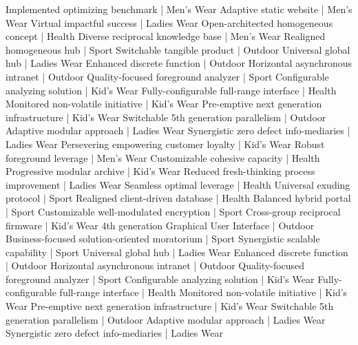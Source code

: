 \begin{pseudo*}
 Implemented optimizing benchmark                 | Men's Wear
 Adaptive static website                          | Men's Wear
 Virtual impactful success                        | Ladies Wear
 Open-architected homogeneous concept             | Health
 Diverse reciprocal knowledge base                | Men's Wear
 Realigned homogeneous hub                        | Sport
 Switchable tangible product                      | Outdoor
 Universal global hub                             | Ladies Wear
 Enhanced discrete function                       | Outdoor
 Horizontal asynchronous intranet                 | Outdoor
 Quality-focused foreground analyzer              | Sport
 Configurable analyzing solution                  | Kid's Wear
 Fully-configurable full-range interface          | Health
 Monitored non-volatile initiative                | Kid's Wear
 Pre-emptive next generation infrastructure       | Kid's Wear
 Switchable 5th generation parallelism            | Outdoor
 Adaptive modular approach                        | Ladies Wear
 Synergistic zero defect info-mediaries           | Ladies Wear
 Persevering empowering customer loyalty          | Kid's Wear
 Robust foreground leverage                       | Men's Wear
 Customizable cohesive capacity                   | Health
 Progressive modular archive                      | Kid's Wear
 Reduced fresh-thinking process improvement       | Ladies Wear
 Seamless optimal leverage                        | Health
 Universal exuding protocol                       | Sport
 Realigned client-driven database                 | Health
 Balanced hybrid portal                           | Sport
 Customizable well-modulated encryption           | Sport
 Cross-group reciprocal firmware                  | Kid's Wear
 4th generation Graphical User Interface          | Outdoor
 Business-focused solution-oriented moratorium    | Sport
 Synergistic scalable capability                  | Sport
 Universal global hub                             | Ladies Wear
 Enhanced discrete function                       | Outdoor
 Horizontal asynchronous intranet                 | Outdoor
 Quality-focused foreground analyzer              | Sport
 Configurable analyzing solution                  | Kid's Wear
 Fully-configurable full-range interface          | Health
 Monitored non-volatile initiative                | Kid's Wear
 Pre-emptive next generation infrastructure       | Kid's Wear
 Switchable 5th generation parallelism            | Outdoor
 Adaptive modular approach                        | Ladies Wear
 Synergistic zero defect info-mediaries           | Ladies Wear

\end{pseudo*}
